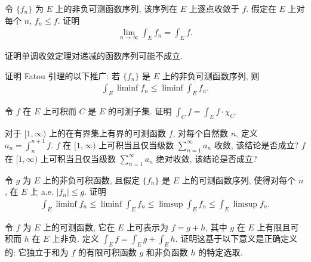 \documentclass[../../main.tex]{subfiles}
\begin{document}
\begin{exercise}\label{exercise:ch04-25}
令 $\{f_{n}\}$ 为 $E$ 上的非负可测函数序列, 该序列在 $E$ 上逐点收敛于 $f$. 假定在 $E$ 上对每个 $n$, $f_{n}\leqslant f$. 证明
\begin{align*}
\lim_{n\to\infty}\int_{E}f_{n}=\int_{E}f.
\end{align*}
\end{exercise}

\begin{exercise}\label{exercise:ch04-26}
证明单调收敛定理对递减的函数序列可能不成立.
\end{exercise}

\begin{exercise}\label{exercise:ch04-27}
证明 Fatou 引理的以下推广: 若 $\{f_{n}\}$ 是 $E$ 上的非负可测函数序列, 则
\begin{align*}
\int_{E}\liminf f_{n}\leqslant\liminf\int_{E}f_{n}.
\end{align*}
\end{exercise}

\begin{exercise}\label{exercise:ch04-28}
令 $f$ 在 $E$ 上可积而 $C$ 是 $E$ 的可测子集. 证明 $\int_{C}f=\int_{E}f\cdot\chi_{C}$.
\end{exercise}

\begin{exercise}\label{exercise:ch04-29}
对于 $[1,\infty)$ 上的在有界集上有界的可测函数 $f$, 对每个自然数 $n$, 定义 $a_{n}=\int_{n}^{n+1}f$. $f$ 在 $[1,\infty)$ 上可积当且仅当级数 $\sum_{n=1}^{\infty}a_{n}$ 收敛, 该结论是否成立? $f$ 在 $[1,\infty)$ 上可积当且仅当级数 $\sum_{n=1}^{\infty}a_{n}$ 绝对收敛, 该结论是否成立?
\end{exercise}

\begin{exercise}\label{exercise:ch04-30}
令 $g$ 为 $E$ 上的非负可积函数, 且假定 $\{f_{n}\}$ 是 $E$ 上的可测函数序列, 使得对每个 $n$, 在 $E$ 上 a.e. $|f_{n}|\leqslant g$. 证明
\begin{align*}
\int_{E}\liminf f_{n}\leqslant\liminf\int_{E}f_{n}\leqslant\limsup\int_{E}f_{n}\leqslant\int_{E}\limsup f_{n}.
\end{align*}
\end{exercise}

\begin{exercise}\label{exercise:ch04-31}
令 $f$ 为 $E$ 上的可测函数, 它在 $E$ 上可表示为 $f=g+h$, 其中 $g$ 在 $E$ 上有限且可积而 $h$ 在 $E$ 上非负. 定义 $\int_{E}f=\int_{E}g+\int_{E}h$. 证明这基于以下意义是正确定义的: 它独立于和为 $f$ 的有限可积函数 $g$ 和非负函数 $h$ 的特定选取.
\end{exercise}
\end{document}
